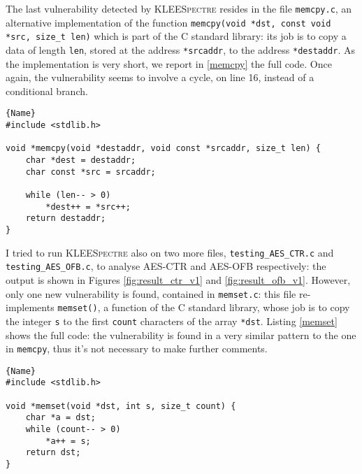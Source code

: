 \documentclass[12pt,a4paper]{book}
\theoremstyle{definition}
\begin{document}
	The last vulnerability detected by \textsc{KLEESpectre} resides in the file \texttt{memcpy.c}, an alternative implementation of the function \texttt{memcpy(void *dst, const void *src, size\_t len)} which is part of the C standard library: its job is to copy a data of length \texttt{len}, stored at the address \texttt{*srcaddr}, to the address \texttt{*destaddr}. As the implementation is very short, we report in \ref{memcpy} the full code. Once again, the vulnerability seems to involve a cycle, on line 16, instead of a conditional branch.
	
	\lstset{
		numbers=left
	}
	\begin{minipage}{.9\textwidth}
	\begin{lstlisting}[caption=\texttt{memcpy.c}, firstnumber=10, label=memcpy]{Name}
#include <stdlib.h>

void *memcpy(void *destaddr, void const *srcaddr, size_t len) {
	char *dest = destaddr;
	char const *src = srcaddr;
	
	while (len-- > 0)
		*dest++ = *src++;
	return destaddr;
}
	\end{lstlisting}
	\end{minipage}	
	\vspace{3mm}
		
	I tried to run \textsc{KLEESpectre} also on two more files, \texttt{testing\_AES\_CTR.c} and \texttt{testing\_AES\_OFB.c}, to analyse AES-CTR and AES-OFB respectively: the output is shown in Figures \ref{fig:result_ctr_v1} and \ref{fig:result_ofb_v1}. However, only one new vulnerability is found, contained in \texttt{memset.c}: this file re-implements \texttt{memset()}, a function of the C standard library, whose job is to copy the integer \texttt{s} to the first \texttt{count} characters of the array \texttt{*dst}. Listing \ref{memset} shows the full code: the vulnerability is found in a very similar pattern to the one in \texttt{memcpy}, thus it's not necessary to make further comments.

	\begin{minipage}{.75\textwidth}
		\begin{lstlisting}[caption=\texttt{memcpy.c}, firstnumber=10, label=memset]{Name}
#include <stdlib.h>

void *memset(void *dst, int s, size_t count) {
	char *a = dst;
	while (count-- > 0)
		*a++ = s;
	return dst;
}
		\end{lstlisting}
	\end{minipage}
	\vspace{3mm}
	
\end{document}
